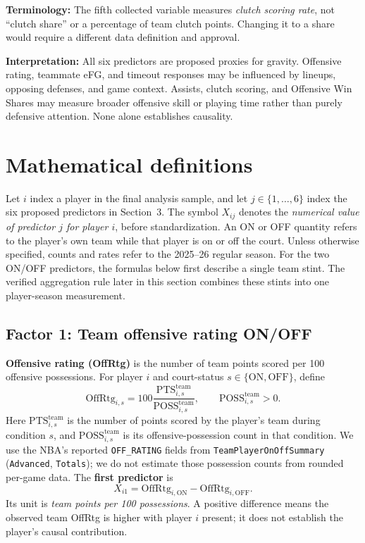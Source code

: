 \documentclass[11pt]{article}
\begin{document}
\textbf{Terminology:} The fifth collected variable measures \emph{clutch
scoring rate}, not ``clutch share'' or a percentage of team clutch points.
Changing it to a share would require a different data definition and approval.

\textbf{Interpretation:} All six predictors are proposed proxies for gravity.
Offensive rating, teammate eFG, and timeout responses may be influenced by
lineups, opposing defenses, and game context. Assists, clutch scoring, and Offensive Win Shares may measure broader offensive skill or playing time rather than
purely defensive attention. None alone establishes causality.

\section{Mathematical definitions}
Let $i$ index a player in the final analysis sample, and let $j\in\{1,\dots,6\}$
index the six proposed predictors in Section~3. The symbol $X_{ij}$ denotes
the \emph{numerical value of predictor $j$ for player $i$}, before
standardization. An ON or OFF quantity refers to the player's own team while
that player is on or off the court. Unless otherwise specified, counts and
rates refer to the 2025--26 regular season. For the two ON/OFF predictors, the formulas below first describe a single
team stint. The verified aggregation rule later in this section combines
these stints into one player-season measurement.

\subsection{Factor 1: Team offensive rating ON/OFF}
\textbf{Offensive rating (OffRtg)} is the number of team points scored per
100 offensive possessions. For player $i$ and court-status
$s\in\{\mathrm{ON},\mathrm{OFF}\}$, define
\begin{equation}
\mathrm{OffRtg}_{i,s}
=100\frac{\mathrm{PTS}^{\mathrm{team}}_{i,s}}
{\mathrm{POSS}^{\mathrm{team}}_{i,s}},
\qquad \mathrm{POSS}^{\mathrm{team}}_{i,s}>0.
\label{eq:offrtg}
\end{equation}
Here $\mathrm{PTS}^{\mathrm{team}}_{i,s}$ is the number of points scored by
the player's team during condition $s$, and
$\mathrm{POSS}^{\mathrm{team}}_{i,s}$ is its offensive-possession count in
that condition. We use the NBA's reported \texttt{OFF\_RATING} fields from
\texttt{TeamPlayerOnOffSummary} (\texttt{Advanced}, \texttt{Totals});
we do not estimate those possession counts from rounded per-game data.
The \textbf{first predictor} is
\begin{equation}
\boxed{X_{i1}=\mathrm{OffRtg}_{i,\mathrm{ON}}
-\mathrm{OffRtg}_{i,\mathrm{OFF}}.}
\label{eq:offrtg-diff}
\end{equation}
Its unit is \emph{team points per 100 possessions}. A positive difference
means the observed team OffRtg is higher with player $i$ present; it does
not establish the player's causal contribution.
\end{document}

